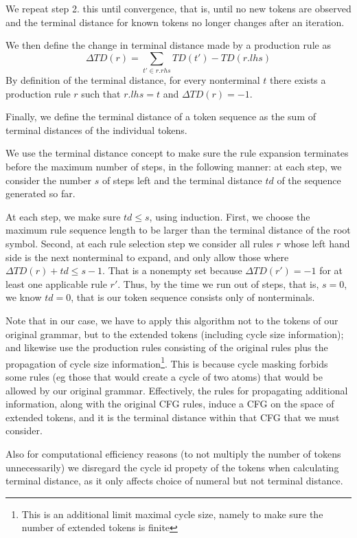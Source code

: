 \documentclass[11pt]{article}
\begin{document}
We repeat step 2. this until convergence, that is, until no new tokens are observed and the terminal distance for known tokens no longer changes after an iteration.

We then define the change in terminal distance made by a production rule as 
\begin{equation}\label{eq:dtd}
\Delta TD(r) =  \sum_{t' \in r.rhs} TD(t') - TD(r.lhs)
\end{equation}
By definition of the terminal distance, for every nonterminal $t$ there exists a production rule $r$ such that $r.lhs = t $ and $\Delta TD(r) = -1$.

Finally, we define the terminal distance of a token sequence as the sum of terminal distances of the individual tokens. 

We use the terminal distance concept to make sure the rule expansion terminates before the maximum number of steps, in the following manner: at each step, we consider the number $s$ of steps left and the terminal distance $td$ of the sequence generated so far. 

At each step, we make sure $td\le s$, using induction. First, we choose the maximum rule sequence length to be larger than the terminal distance of the root symbol. Second, at each rule selection step we consider all rules $r$ whose left hand side is the next nonterminal to expand, and only allow those where $\Delta TD(r) + td \le s-1$. That is a nonempty set because $\Delta TD(r')=-1$ for at least one applicable rule $r'$. Thus, by the time we run out of steps, that is, $s=0$, we know $td=0$, that is our token sequence consists only of nonterminals. 

Note that in our case, we have to apply this algorithm not to the tokens of our original grammar, but to the extended tokens (including cycle size information); and likewise use the production rules consisting of the original rules plus the propagation of cycle size information\footnote{This is an additional limit maximal cycle size, namely to make sure the number of extended tokens is finite}. This is because cycle masking forbids some rules (eg those that would create a cycle of two atoms) that would be allowed by our original grammar. Effectively, the rules for propagating additional information, along with the original CFG rules, induce a CFG on the space of extended tokens, and it is the terminal distance within that CFG that we must consider.
 
Also for computational efficiency reasons (to not multiply the number of tokens unnecessarily) we disregard the cycle id propety of the tokens when calculating terminal distance, as it only affects choice of numeral but not terminal distance. 
\end{document}
